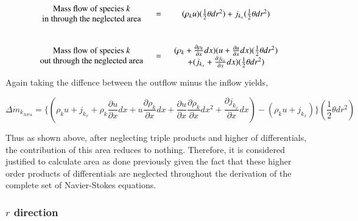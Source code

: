 \begin{displaymath}
	\begin{array}{ccc}
		\begin{array}{c}
			\textrm{Mass flow of species \emph{k}} \\ \textrm{in through the neglected area} 
		\end{array} & 
	= & (\rho_k u)(\frac{1}{2}\theta dr^2) + j_{k_x} (\frac{1}{2}\theta dr^2)\\
	& \\ & \\
		\begin{array}{c}
			\textrm{Mass flow of species \emph{k}} \\ \textrm{out through the neglected area}
		\end{array} & 
	= & \begin{array}{c}
		(\rho_k + \frac{\partial \rho_k}{\partial x}dx)(u + \frac{\partial u}{\partial x}dx)
		(\frac{1}{2}\theta dr^2) \\
	+ (j_{k_x} + \frac{\partial j_{k_x}}{\partial x}dx)(\frac{1}{2}\theta dr^2)
		\end{array}
	\end{array}
\end{displaymath}

	Again taking the diffence between the outflow minus the inflow yields,

\begin{displaymath}
	\Delta \dot{m}_{k_{\textrm{Area}}} = \Big\{(\rho_k u + j_{k_x} + \rho_k \frac{\partial u}{\partial x}dx 
					     + u \frac{\partial \rho_k}
	{\partial x}dx + \frac{\partial u}{\partial x} \frac{\partial \rho_k}{\partial x}dx^2 + \frac{\partial j_{k_x}}
	{\partial x}dx) - (\rho_k u + j_{k_x})\Big\}(\frac{1}{2}\theta dr^2)
\end{displaymath}

	Thus as shown above, after neglecting triple products and higher of differentials, the contribution of this area 
reduces to nothing.  Therefore, it is considered justified to calculate area as done previously given the fact that these 
higher order products of differentials are neglected throughout the derivation of the complete set of Navier-Stokes 
equations.

\subsubsection{$r$ direction}

